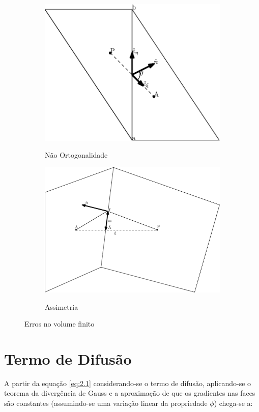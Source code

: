 \begin{figure}
    \begin{subfigure}{.5\textwidth}
        \centering
        \caption{Não Ortogonalidade}
        \includegraphics[width=.8\linewidth]{fig/nao-ortogo}
        \label{nao-ortogo}
    \end{subfigure}
    \begin{subfigure}{.5\textwidth}
        \centering
        \caption{Assimetria}
        \includegraphics[width=.8\linewidth]{fig/assimetria.eps}
        \label{fig:assimetria}
    \end{subfigure}

    \caption{Erros no volume finito}
\end{figure}

\section{Termo de Difusão}

A partir da equação \ref{eq:2.1} considerando-se o termo de difusão, aplicando-se o teorema da divergência de Gauss e a aproximação de que os gradientes nas faces são constantes (assumindo-se uma variação linear da propriedade $\phi$) chega-se a:

